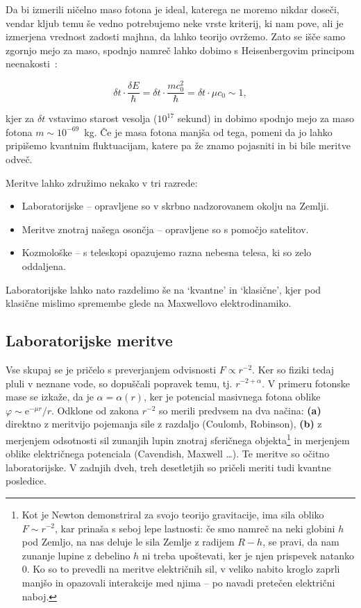\documentclass[a4paper, twocolumn, titlepage]{article}
\begin{document}
Da bi izmerili ni\v celno maso fotona je ideal, katerega ne moremo nikdar dose\v ci, vendar kljub temu \v se vedno
potrebujemo neke vrste kriterij, ki nam pove, ali je izmerjena vrednost zadosti majhna, da lahko teorijo ovr\v zemo.
Zato se i\v s\v ce samo zgornjo mejo za maso, spodnjo namre\v c lahko dobimo s Heisenbergovim principom
neenakosti~\cite{over}:

\begin{equation}
	\delta t \cdot \frac{\delta E}{\hbar} = \delta t \cdot \frac{mc_0^2}{\hbar} = \delta t \cdot \mu c_0 \sim 1,
\end{equation}

kjer za $\delta t$ vstavimo starost vesolja ($10^{17}$ sekund) in dobimo spodnjo mejo za maso fotona \hbox{$m \sim
10^{-69}$ kg}.
\v Ce je masa fotona manj\v sa od tega, pomeni da jo lahko pripi\v semo kvantnim fluktuacijam, katere pa \v ze znamo
pojasniti in bi bile meritve odve\v c.

Meritve lahko združimo nekako v tri razrede:
\begin{itemize}
	\item{Laboratorijske -- opravljene so v skrbno nadzorovanem okolju na Zemlji.}
	\item{Meritve znotraj na\v sega oson\v cja -- opravljene so s pomočjo satelitov.}
	\item{Kozmološke -- s teleskopi opazujemo razna nebesna telesa, ki so zelo oddaljena.}
\end{itemize}

Laboratorijske lahko nato razdelimo še na `kvantne' in `klasične', kjer pod klasične mislimo spremembe glede na Maxwellovo
elektrodinamiko.

\subsection{Laboratorijske meritve}

Vse skupaj se je pričelo s preverjanjem odvisnosti $F \propto r^{-2}$. Ker so fiziki tedaj pluli v neznane vode, so dopuščali
popravek temu, tj. $r^{-2 + \alpha}$. V primeru fotonske mase se izkaže, da je $\alpha = \alpha (r)$, ker je potencial masivnega
fotona oblike $\varphi \sim \text{e}^{-\mu r}/r$. Odklone od zakona $r^{-2}$ so merili predvsem na dva načina: \textbf{(a)} direktno
z meritvijo pojemanja sile z razdaljo (Coulomb, Robinson), \textbf{(b)} z merjenjem odsotnosti sil zunanjih lupin znotraj
sferičnega objekta\footnote{Kot je Newton demonstriral za svojo teorijo gravitacije, ima sila obliko $F \sim r^{-2}$, kar prinaša s
seboj lepe lastnosti: če smo namreč na neki globini $h$ pod Zemljo, na nas deluje le sila Zemlje z radijem $R - h$, se pravi, da
nam zunanje lupine z debelino $h$ ni treba upoštevati, ker je njen prispevek natanko 0. Ko so to prevedli na meritve električnih
sil, v veliko nabito kroglo zaprli manjšo in opazovali interakcije med njima -- po navadi pretečen električni naboj.} in
merjenjem oblike električnega potenciala (Cavendish, Maxwell \ldots). Te meritve so očitno laboratorijske. V zadnjih dveh, treh
desetletjih so pričeli meriti tudi kvantne posledice.
\end{document}
